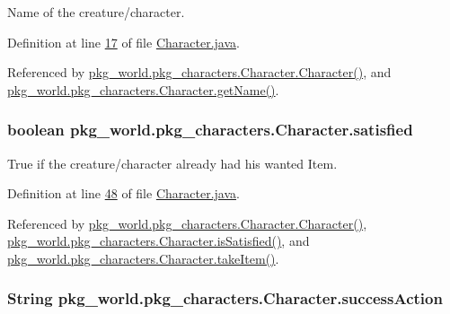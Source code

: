 Name of the creature/character. 



Definition at line \hyperlink{Character_8java_source_l00017}{17} of file \hyperlink{Character_8java_source}{Character.\-java}.



Referenced by \hyperlink{Character_8java_source_l00057}{pkg\-\_\-world.\-pkg\-\_\-characters.\-Character.\-Character()}, and \hyperlink{Character_8java_source_l00127}{pkg\-\_\-world.\-pkg\-\_\-characters.\-Character.\-get\-Name()}.

\hypertarget{classpkg__world_1_1pkg__characters_1_1Character_a63a989f34f7ec28cf9e8c6c2a19c7daa}{
\subsubsection[{satisfied}]{\setlength{\rightskip}{0pt plus 5cm}boolean pkg\-\_\-world.\-pkg\-\_\-characters.\-Character.\-satisfied\hspace{0.3cm}{\ttfamily [private]}}}\label{classpkg__world_1_1pkg__characters_1_1Character_a63a989f34f7ec28cf9e8c6c2a19c7daa}


True if the creature/character already had his wanted Item. 



Definition at line \hyperlink{Character_8java_source_l00048}{48} of file \hyperlink{Character_8java_source}{Character.\-java}.



Referenced by \hyperlink{Character_8java_source_l00057}{pkg\-\_\-world.\-pkg\-\_\-characters.\-Character.\-Character()}, \hyperlink{Character_8java_source_l00131}{pkg\-\_\-world.\-pkg\-\_\-characters.\-Character.\-is\-Satisfied()}, and \hyperlink{Character_8java_source_l00108}{pkg\-\_\-world.\-pkg\-\_\-characters.\-Character.\-take\-Item()}.

\hypertarget{classpkg__world_1_1pkg__characters_1_1Character_a3f1c0fc80b859a8625f334782b1bb74a}{
\subsubsection[{success\-Action}]{\setlength{\rightskip}{0pt plus 5cm}String pkg\-\_\-world.\-pkg\-\_\-characters.\-Character.\-success\-Action\hspace{0.3cm}{\ttfamily [private]}}}\label{classpkg__world_1_1pkg__characters_1_1Character_a3f1c0fc80b859a8625f334782b1bb74a}


